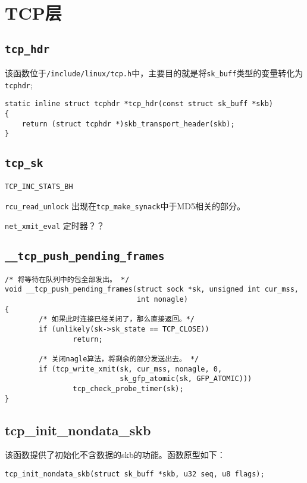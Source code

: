 \section{TCP层}
    \subsection{\texttt{tcp_hdr}}

        该函数位于\texttt{/include/linux/tcp.h}中，主要目的就是将\texttt{sk_buff}类型的变量转化为\texttt{tcphdr};
\begin{verbatim}
static inline struct tcphdr *tcp_hdr(const struct sk_buff *skb)
{
    return (struct tcphdr *)skb_transport_header(skb);
}
\end{verbatim}

    \subsection{\texttt{tcp_sk}}

    \texttt{TCP_INC_STATS_BH}

    \texttt{rcu_read_unlock} 出现在\texttt{tcp_make_synack}中于MD5相关的部分。
    
    \texttt{net_xmit_eval}   定时器？？

\subsection{\texttt{__tcp_push_pending_frames}}
\begin{verbatim}
/* 将等待在队列中的包全部发出。 */
void __tcp_push_pending_frames(struct sock *sk, unsigned int cur_mss,
                               int nonagle)
{
        /* 如果此时连接已经关闭了，那么直接返回。*/
        if (unlikely(sk->sk_state == TCP_CLOSE))
                return;

        /* 关闭nagle算法，将剩余的部分发送出去。 */
        if (tcp_write_xmit(sk, cur_mss, nonagle, 0,
                           sk_gfp_atomic(sk, GFP_ATOMIC)))
                tcp_check_probe_timer(sk);
}
\end{verbatim}

\subsection{tcp\_init\_nondata\_skb}
该函数提供了初始化不含数据的skb的功能。函数原型如下：
\begin{verbatim}
tcp_init_nondata_skb(struct sk_buff *skb, u32 seq, u8 flags);
\end{verbatim}

